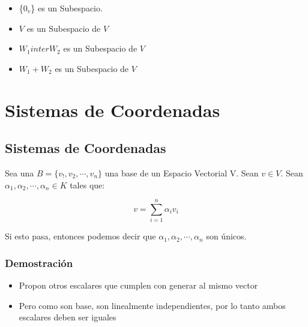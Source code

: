 \documentclass[12pt]{report}							    %
\begin{document}
        \begin{itemize}
            \item \{$0_v$\} es un Subespacio.

            \item $V$ es un Subespacio de $V$

            \item $W_1 inter W_2$ es un Subespacio de $V$

            \item $W_1 + W_2$ es un Subespacio de $V$
        \end{itemize}

\chapter{Sistemas de Coordenadas}
    \clearpage

    \section{Sistemas de Coordenadas}

        Sea una $B = \{ v_!, v_2, \cdots, v_n\}$ una base de un Espacio Vectorial V.
        Sean $v \in V$.
        Sean $\alpha_1, \alpha_2, \cdots, \alpha_n \in K$ tales que:

        \begin{equation}
            v = \sum_{i=1}^{n} \alpha_i v_i
        \end{equation}

        Si esto pasa, entonces podemos decir que  $\alpha_1, \alpha_2, \cdots, \alpha_n$ son únicos.

        \subsection{Demostración}
        \begin{itemize}
            \item Propon otros escalares que cumplen con generar al mismo vector
            \item Pero como son base, son linealmente independientes, por lo tanto ambos escalares deben ser iguales
        \end{itemize}
\end{document}
